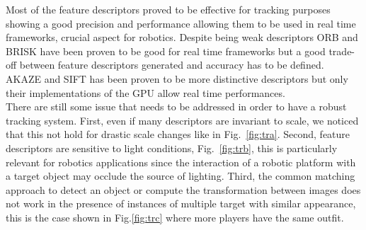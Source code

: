 Most of the feature descriptors proved to be effective for tracking purposes showing a good precision and performance allowing them to be used in real time frameworks, crucial aspect for robotics. Despite being weak descriptors ORB and BRISK have been proven to be good for real time frameworks but a good trade-off between feature descriptors generated and accuracy has to be defined. AKAZE and SIFT has been proven to be more distinctive descriptors but only their implementations of the GPU allow real time performances. \\
There are still some issue that needs to be addressed in order to have a robust tracking system. First, even if many descriptors are invariant to scale, we noticed that this not hold for drastic scale changes like in Fig.~\ref{fig:tra}. Second, feature descriptors are sensitive to light conditions, Fig.~\ref{fig:trb}, this is particularly relevant for robotics applications since the interaction of a robotic platform with a target object may occlude the source of lighting. Third, the common matching approach to detect an object or compute the transformation between images \cite{mikolajczyk05} does not work in the presence of instances of multiple target with similar appearance, this is the case shown in Fig.\ref{fig:trc} where more players have the same outfit.









